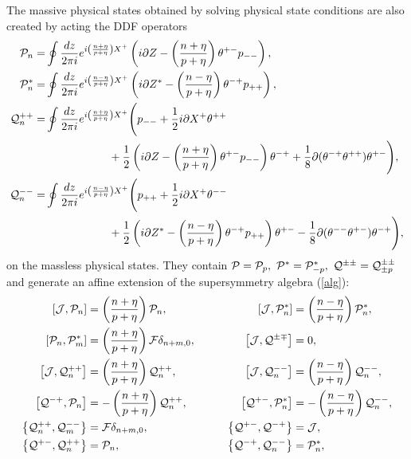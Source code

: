 \documentclass[a4paper,seceq,preprint]{ptptex}
\newcommand{\dz}{\frac{dz}{2\pi i}}
\begin{document}
The massive physical states obtained by solving physical
state conditions are also created by acting the DDF operators
\begin{align}
   {\cal P}_n=&\oint\dz 
e^{i\left(\frac{n+\eta}{p+\eta}\right)X^+}
\left(i\partial Z-\left(\frac{n+\eta}{p+\eta}\right)
\theta^{+-}p_{--}\right),\nonumber\\
 {\cal P}^*_n=&\oint\dz 
e^{i\left(\frac{n-\eta}{p+\eta}\right)X^+}
\left(i\partial Z^*-\left(\frac{n-\eta}{p+\eta}\right)
\theta^{-+}p_{++}\right),\nonumber\\
{\cal Q}^{++}_n=&\oint\dz 
e^{i\left(\frac{n+\eta}{p+\eta}\right)X^+}
\Bigg(p_{--}+\frac{1}{2}i\partial X^+\theta^{++}\nonumber\\
&\hspace{2cm}
+\frac{1}{2}\left(i\partial Z
-\left(\frac{n+\eta}{p+\eta}\right)\theta^{+-}p_{--}\right)\theta^{-+}
+\frac{1}{8}\partial(\theta^{-+}\theta^{++})\theta^{+-}\Bigg),
\nonumber\\
{\cal Q}^{--}_n=&\oint\dz 
e^{i\left(\frac{n-\eta}{p+\eta}\right)X^+}
\Bigg(p_{++}+\frac{1}{2}i\partial X^+\theta^{--}\nonumber\\
&\hspace{2cm}
+\frac{1}{2}\left(i\partial Z^*
-\left(\frac{n-\eta}{p+\eta}\right)\theta^{-+}p_{++}\right)\theta^{+-}
-\frac{1}{8}\partial(\theta^{--}\theta^{+-})\theta^{-+}\Bigg),
\end{align}
on the massless physical states.\cite{HS2} 
They contain ${\cal P}={\cal P}_p,\ {\cal P}^*={\cal P}^*_{-p},\
{\cal Q}^{\pm\pm}={\cal Q}^{\pm\pm}_{\pm p}$
and generate an affine extension of the supersymmetry algebra (\ref{alg}):
\begin{alignat}{2}
\left[{\cal J},{\cal P}_n\right]
&=\left(\frac{n+\eta}{p+\eta}\right){\cal P}_n,&\qquad
\left[{\cal J},{\cal P}^*_n\right]
&=\left(\frac{n-\eta}{p+\eta}\right){\cal P}^*_n,\nonumber\\
 \left[{\cal P}_n,{\cal P}^*_m\right]
&=\left(\frac{n+\eta}{p+\eta}\right){\cal F}\delta_{n+m,0},&\qquad
\left[{\cal J},{\cal Q}^{\pm\mp}\right]&=0,
\nonumber\\
\left[{\cal J},{\cal Q}^{++}_n\right]
&=\left(\frac{n+\eta}{p+\eta}\right){\cal Q}^{++}_n,&\qquad
\left[{\cal J},{\cal Q}^{--}_n\right]
&=\left(\frac{n-\eta}{p+\eta}\right){\cal Q}^{--}_n,\nonumber\\
\left[{\cal Q}^{-+},{\cal P}_n\right]
&=-\left(\frac{n+\eta}{p+\eta}\right){\cal Q}^{++}_n,&\qquad
\left[{\cal Q}^{+-},{\cal P}^*_n\right]
&=-\left(\frac{n-\eta}{p+\eta}\right){\cal Q}^{--}_n,\nonumber\\
 \left\{{\cal Q}^{++}_n,{\cal Q}^{--}_m\right\}&=
{\cal F}\delta_{n+m,0},&\qquad
 \left\{{\cal Q^{+-}},{\cal Q}^{-+}\right\}&={\cal J},\nonumber\\
\left\{{\cal Q}^{+-},{\cal Q}^{++}_n\right\}&={\cal P}_n,&\qquad
\left\{{\cal Q}^{-+},{\cal Q}^{--}_n\right\}&={\cal P}^*_n,
\end{alignat}
\end{document}
